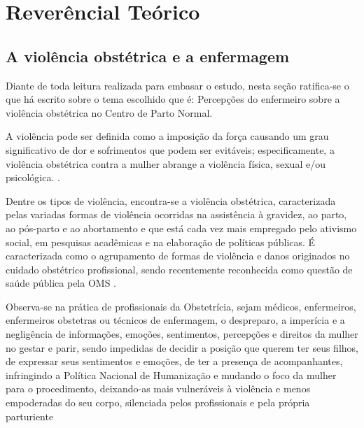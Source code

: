 \chapter{Reverêncial Teórico}
\label{sec:revisao}

\section{A violência obstétrica e a enfermagem}

Diante de toda leitura realizada para embasar o estudo, nesta seção ratifica-se o que há escrito sobre o tema escolhido que é: Percepções do enfermeiro sobre a violência obstétrica no Centro de Parto Normal.

A violência pode ser definida como a imposição da força causando um grau significativo de dor e sofrimentos que podem ser evitáveis; especificamente, a violência obstétrica contra a mulher abrange a violência física, sexual e/ou psicológica. \cite{cardoso2017violencia}.

Dentre os tipos de violência, encontra-se a violência obstétrica, caracterizada pelas variadas formas de violência ocorridas na assistência à gravidez, ao parto, ao pós-parto e ao abortamento e que está cada vez mais empregado pelo ativismo social, em pesquisas acadêmicas e na elaboração de políticas públicas. É caracterizada como o agrupamento de formas de violência e danos originados no cuidado obstétrico profissional, sendo recentemente reconhecida como questão de saúde pública pela OMS \cite{diniz2015abuse,sena2016violencia}.

Observa-se na prática de profissionais da Obstetrícia, sejam médicos, enfermeiros, enfermeiros obstetras ou técnicos de enfermagem, o despreparo, a imperícia e a negligência de informações, emoções, sentimentos, percepções e direitos da mulher no gestar e parir, sendo impedidas de decidir a posição que querem ter seus filhos, de expressar seus sentimentos e emoções, de ter a presença de acompanhantes, infringindo a Política Nacional de Humanização e mudando o foco da mulher para o procedimento, deixando-as mais vulneráveis à violência e menos empoderadas do seu corpo, silenciada pelos profissionais e pela própria parturiente \cite{andrade2014violencia,gonccalves2014violencia}


